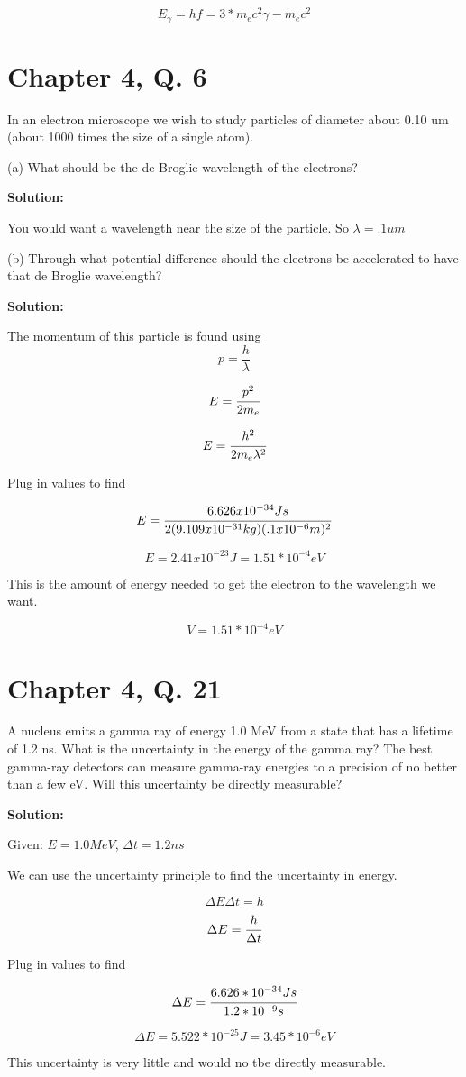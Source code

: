 \documentclass{article}
\begin{document}
$$ E_\gamma = hf = 3 * m_ec^2\gamma - m_ec^2$$


\section*{Chapter 4, Q. 6}

In an electron microscope we wish to study particles of diameter about 0.10 um (about 1000 times the size of a single atom).

(a) What should be the de Broglie wavelength of the electrons?

\textbf{Solution:}

You would want a wavelength near the size of the particle. So $ \lambda = .1um $


(b) Through what potential difference should the electrons be accelerated to have that de Broglie wavelength?

\textbf{Solution:}

The momentum of this particle is found using
$$ p = \frac{h}{\lambda} $$

$$ E = \cfrac{p^2}{2m_e} $$

$$ E = \cfrac{h^2}{2m_e\lambda^2} $$

Plug in values to find

$$ E = \cfrac{6.626x10^{-34}Js}{2(9.109x10^{-31}kg)(.1x10^{-6}m)^2} $$

$$ E = 2.41 x 10^{-23} J = 1.51 * 10^{-4} eV $$

This is the amount of energy needed to get the electron to the wavelength we want.

$$ V = 1.51 * 10^{-4} eV $$

\section*{Chapter 4, Q. 21}

A nucleus emits a gamma ray of energy 1.0 MeV from a state that has a lifetime of 1.2 ns. What is the uncertainty in the energy of the gamma ray? The best gamma-ray detectors can measure gamma-ray energies to a precision of no better than a few eV. Will this uncertainty be directly measurable?


\textbf{Solution:}

Given: $ E = 1.0 MeV$, $ \Delta t = 1.2 ns $

We can use the uncertainty principle to find the uncertainty in energy.

$$ \Delta E \Delta t = h $$
$$ \Delta E = \cfrac{h}{\Delta t} $$

Plug in values to find

$$ \Delta E = \cfrac{6.626*10^{-34}Js}{1.2*10^{-9}s} $$

$$ \Delta E = 5.522 * 10^{-25} J = 3.45*10^{-6} eV $$

This uncertainty is very little and would no tbe directly measurable.
\end{document}
